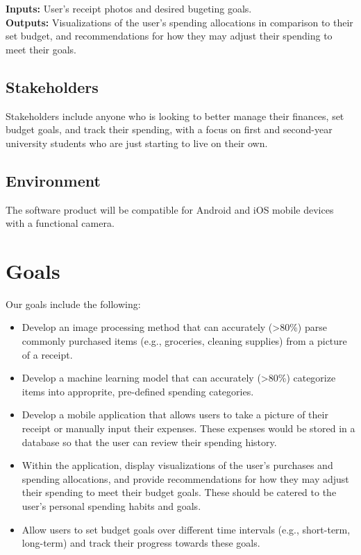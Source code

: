 \documentclass{article}
\begin{document}

\textbf{Inputs:} User's receipt photos and desired bugeting goals.\\
\textbf{Outputs:} Visualizations of the user's spending allocations in
comparison to their set budget, and recommendations for how they may adjust
their spending to meet their goals.

\subsection{Stakeholders}

Stakeholders include anyone who is looking to better manage their finances, set
budget goals, and track their spending, with a focus on first and second-year
university students who are just starting to live on their own.

\subsection{Environment}


The software product will be compatible for Android and iOS mobile devices with
a functional camera.

\section{Goals}

Our goals include the following:
\begin{itemize}
    \item Develop an image processing method that can accurately
    (\textgreater80\%) parse commonly purchased items (e.g., groceries, cleaning
    supplies) from a picture of a receipt.
    \item Develop a machine learning model that can accurately
    (\textgreater80\%) categorize items into approprite, pre-defined spending
    categories. 
    \item Develop a mobile application that allows users to take a picture of
    their receipt or manually input their expenses. These expenses would be
    stored in a database so that the user can review their spending history.
    \item Within the application, display visualizations of the user's purchases
    and spending allocations, and provide recommendations for how they may
    adjust their spending to meet their budget goals. These should be catered to
    the user's personal spending habits and goals.
    \item Allow users to set budget goals over different time intervals (e.g.,
    short-term, long-term) and track their progress towards these goals.
\end{itemize}
\end{document}
